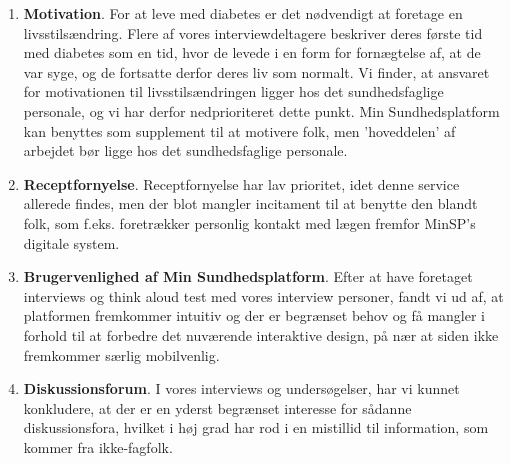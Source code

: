 \begin{enumerate}
	\item \textbf{Motivation}. For at leve med diabetes er det nødvendigt at foretage en livsstilsændring. Flere af vores interviewdeltagere beskriver deres første tid med diabetes som en tid, hvor de levede i en form for fornægtelse af, at de var syge, og de fortsatte derfor deres liv som normalt. 
	Vi finder, at ansvaret for motivationen til livsstilsændringen ligger hos det sundhedsfaglige personale, og vi har derfor nedprioriteret dette punkt. Min Sundhedsplatform kan benyttes som supplement til at motivere folk, men 'hoveddelen' af arbejdet bør ligge hos det sundhedsfaglige personale.
	\item \textbf{Receptfornyelse}. Receptfornyelse har lav prioritet, idet denne service allerede findes, men der blot mangler incitament til at benytte den blandt folk, som f.eks. foretrækker personlig kontakt med lægen fremfor MinSP's digitale system.
	\item \textbf{Brugervenlighed af Min Sundhedsplatform}. Efter at have foretaget interviews og think aloud test med vores interview personer, fandt vi ud af, at platformen fremkommer intuitiv og der er begrænset behov og få mangler i forhold til at forbedre det nuværende interaktive design, på nær at siden ikke fremkommer særlig mobilvenlig.
	\item \textbf{Diskussionsforum}. I vores interviews og undersøgelser, har vi kunnet konkludere, at der er en yderst begrænset interesse for sådanne diskussionsfora, hvilket i høj grad har rod i en mistillid til information, som kommer fra ikke-fagfolk.
\end{enumerate}
